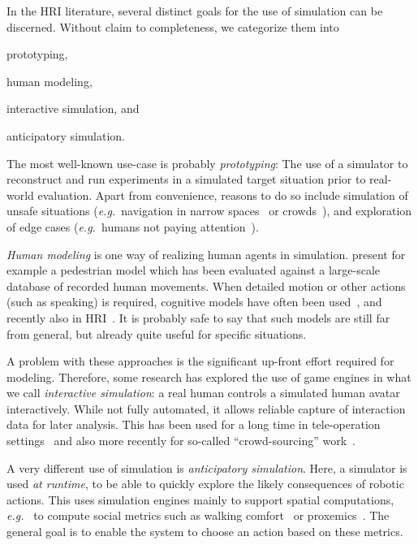 \documentclass{llncs}
\newcommand{\eg}{{\textit{e.g.~}}}
\begin{document}
\begin{inparaenum}[\itshape 1\upshape)]
In the HRI literature, several distinct goals for the use of simulation can be 
discerned. Without claim to completeness, we categorize them into \item prototyping, 
\item human modeling, \item interactive simulation, and \item anticipatory simulation.  
\end{inparaenum}

The most well-known use-case is probably \emph{prototyping}: The use of a
simulator to reconstruct and run experiments in a simulated target situation
prior to real-world evaluation. Apart from convenience, reasons to do so include
simulation of unsafe situations (\eg navigation in narrow
spaces~\cite{sisbot2007human,kidokoro2013will} or
crowds~\cite{henry2010learning}), and exploration of edge cases (\eg humans not
paying attention~\cite{knepper2012pedestrian,guzzi2013human}).

\emph{Human modeling} is one way of realizing human agents in simulation.
\cite{garrell2010model} present for example a pedestrian model which has been
evaluated against a large-scale database of recorded human movements. When
detailed motion or other actions (such as speaking) is required, cognitive
models have often been used~\cite{sun2006cognition}, and recently also in
HRI~\cite{trafton2013act}.  It is probably safe to say that such models are
still far from general, but already quite useful for specific situations.

A problem with these approaches is the significant up-front effort required for
modeling. Therefore, some research has explored the use of game engines in what
we call \emph{interactive simulation}: a real human controls a simulated human
avatar interactively. While not fully automated, it allows reliable capture of
interaction data for later analysis. This has been used for a long time in
tele-operation settings~\cite{wang2005validating} and also more recently for
so-called ``crowd-sourcing'' work~\cite{breazeal2013crowdsourcing}.

A very different use of simulation is \emph{anticipatory simulation}. Here, 
a simulator is used \emph{at runtime}, to
be able to quickly explore the likely consequences of robotic actions. This
uses simulation engines mainly to support spatial computations, \eg
to compute social metrics such as walking comfort~\cite{kidokoro2013will} or
proxemics~\cite{hoffman2010effects}. The general goal is to enable the system to
choose an action based on these metrics.
\end{document}
